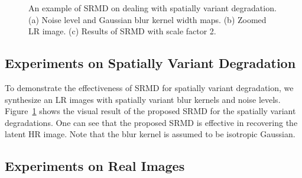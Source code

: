\documentclass[10pt,twocolumn,letterpaper]{article}
\begin{document}
\begin{figure}[!t]%
\begin{center}
\hspace{0.05cm}
\caption{An example of SRMD on dealing with spatially variant degradation. (a) Noise level and Gaussian blur kernel width maps. (b) Zoomed LR image. (c) Results of SRMD with scale factor 2.}\label{fig_sv1}
\end{center}\vspace{-0.75cm}
\end{figure}


\subsection{Experiments on Spatially Variant Degradation}

To demonstrate the effectiveness of SRMD for spatially variant degradation, we synthesize an LR images with spatially variant blur kernels and noise levels.
Figure~\ref{fig_sv1} shows the visual result of the proposed SRMD for the spatially variant degradations.
One can see that the proposed SRMD is effective in recovering the latent HR image.
Note that the blur kernel is assumed to be isotropic Gaussian.


\subsection{Experiments on Real Images}
\end{document}
